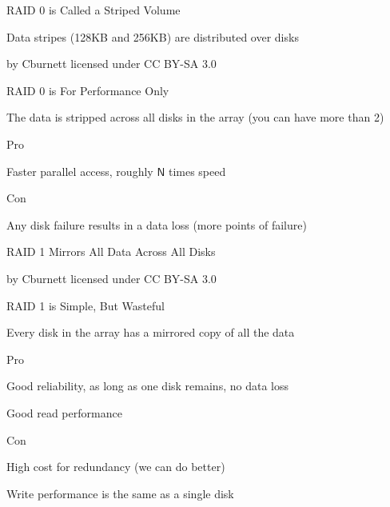   \begin{frame}{RAID 0 is Called a Striped Volume}

    Data stripes (128KB and 256KB) are distributed over disks

    \begin{center}
      
    \end{center}
    
    \begin{flushright}
      by Cburnett licensed under CC BY-SA 3.0
    \end{flushright}
  \end{frame}

  \begin{frame}{RAID 0 is For Performance Only}

    The data is stripped across all disks in the array (you can have more than 2)

    \vspace{2em}

    Pro

    \hspace{2em} Faster parallel access, roughly $\mathsf{N}$ times speed

    \vspace{2em}

    Con

    \hspace{2em} Any disk failure results in a data loss (more points of failure)
  \end{frame}

  \begin{frame}{RAID 1 Mirrors All Data Across All Disks}

    \begin{center}
      
    \end{center}

    \begin{flushright}
      by Cburnett licensed under CC BY-SA 3.0
    \end{flushright}
  \end{frame}

  \begin{frame}{RAID 1 is Simple, But Wasteful}

    Every disk in the array has a mirrored copy of all the data

    \vspace{2em}

    Pro

    \hspace{2em} Good reliability, as long as one disk remains, no data loss

    \hspace{2em} Good read performance

    \vspace{2em}

    Con

    \hspace{2em} High cost for redundancy (we can do better)

    \hspace{2em} Write performance is the same as a single disk
  \end{frame}

